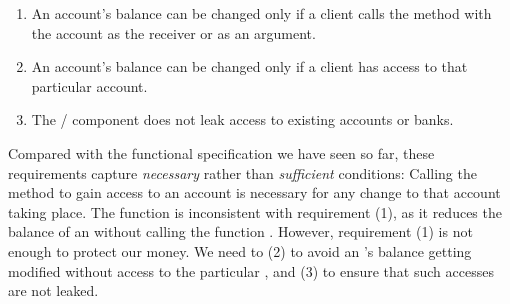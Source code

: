 \begin{enumerate}
\item %
An account's
  balance can be changed only  if a client   calls the  method  with the
  account as the receiver or as an argument. 
\item An account's balance can be changed  only  if a client has
  access to that  particular account. %
\item The / component does not leak access to existing accounts or banks. 
\end{enumerate}

Compared with the functional specification we have seen so far, these
requirements %
capture \emph{necessary} %
rather than
\emph{sufficient} conditions:  Calling the 
method to gain access to an account %
is necessary for any change to that account taking place.
The  function 
 is inconsistent with requirement  (1), as it reduces the balance of an  without calling the
function . 
However, requirement  (1) is not enough to protect our money. We need to (2) to avoid an 's balance getting
modified without access to the particular , and (3) to ensure that such accesses are not leaked. 


